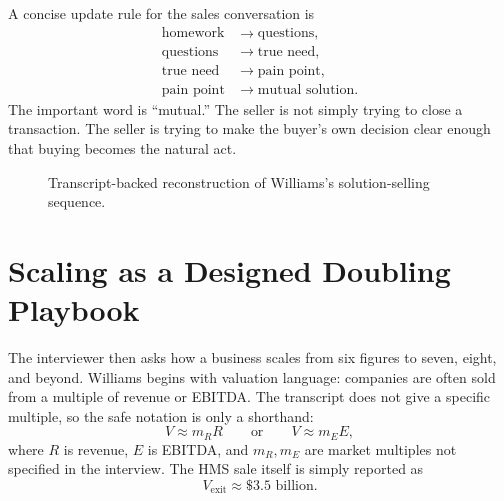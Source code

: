 A concise update rule for the sales conversation is
\begin{align}
\text{homework} &\longrightarrow \text{questions},\\
\text{questions} &\longrightarrow \text{true need},\\
\text{true need} &\longrightarrow \text{pain point},\\
\text{pain point} &\longrightarrow \text{mutual solution}.
\end{align}
The important word is ``mutual.'' The seller is not simply trying to close a transaction. The seller is trying to make the buyer's own decision clear enough that buying becomes the natural act.

\begin{figure}
\centering
{}
\caption{Transcript-backed reconstruction of Williams's solution-selling sequence.}
\end{figure}

\section{Scaling as a Designed Doubling Playbook}

The interviewer then asks how a business scales from six figures to seven, eight, and beyond. Williams begins with valuation language: companies are often sold from a multiple of revenue or EBITDA. The transcript does not give a specific multiple, so the safe notation is only a shorthand:
\begin{equation}
V \approx m_R R
\qquad\text{or}\qquad
V \approx m_E E,
\end{equation}
where \(R\) is revenue, \(E\) is EBITDA, and \(m_R,m_E\) are market multiples not specified in the interview. The HMS sale itself is simply reported as
\begin{equation}
V_{\mathrm{exit}} \approx \$3.5\text{ billion}.
\end{equation}

